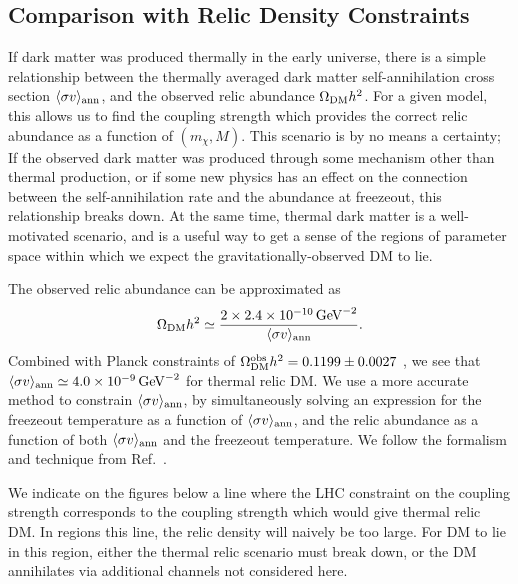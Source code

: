 \subsection{Comparison with Relic Density Constraints}


If dark matter was produced thermally in the early universe, there is a simple relationship between the thermally averaged dark matter self-annihilation cross section $\langle\sigma v\rangle_{\rm ann}$, and the observed relic abundance $\Omega_{\rm DM}h^2$. For a given model, this allows us to find the coupling strength which provides the correct relic abundance as a function of $(m_\chi, M)$. 
%
This scenario is by no means a certainty; If the observed dark matter was produced through some mechanism other than thermal production, or if some new physics has an effect on the connection between the self-annihilation rate and the abundance at freezeout, this relationship breaks down. At the same time, thermal dark matter is a well-motivated scenario, and is a useful way to get a sense of the regions of parameter space within which we expect the gravitationally-observed DM to lie. 

The observed relic abundance can be approximated as
%
\begin{equation}
\Omega_{\rm DM}h^2\simeq \frac{2\times2.4\times 10^{-10}\,{\rm GeV}^{-2}}{\langle\sigma v\rangle_{\rm ann}}.
\label{simplerelic}
\end{equation}
%
Combined with Planck constraints of $\Omega_{\rm DM}^{\rm obs}h^2=0.1199\pm0.0027$ \cite{Ade:2013zuv}, we see that $\langle\sigma v\rangle_{\rm ann}\simeq 4.0\times 10^{-9}\,{\rm GeV}^{-2}$ for thermal relic DM. 
%
We use a more accurate method to constrain $\langle\sigma v\rangle_{\rm ann}$, by simultaneously solving an expression for the freezeout temperature as a function of $\langle\sigma v\rangle_{\rm ann}$, and the relic abundance as a function of both $\langle\sigma v\rangle_{\rm ann}$ and the freezeout temperature. We follow the formalism and technique from Ref.~\cite{Busoni:2014gta}.

We indicate on the figures below a line where the LHC constraint on the coupling strength corresponds to the coupling strength which would give thermal relic DM. In regions  this line, the relic density will naively be too large. For DM to lie in this region, either the thermal relic scenario must break down, or the DM annihilates via additional channels not considered here.
